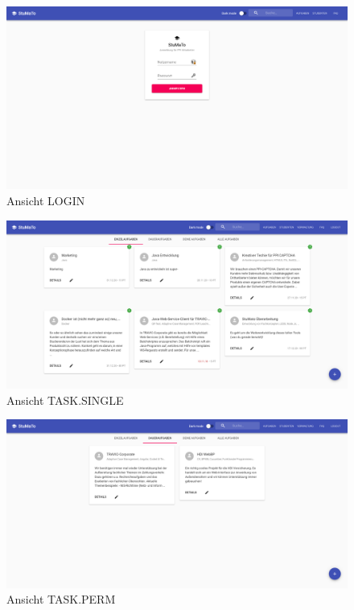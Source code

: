\documentclass[
  12pt,
  ngerman,
  a4paper,
]{article}
\begin{document}
\begin{figure}
\centering
\includegraphics{./tex2pdf.-930e6666e1221838/9c5b8c473ccddcd0dab08da12cb1120c18a9138c.png}
\caption{Ansicht LOGIN}
\end{figure}

\begin{figure}
\centering
\includegraphics{./tex2pdf.-930e6666e1221838/f4cc5b5ab578b1b679cdbb7e8f0658dd5512d9e2.png}
\caption{Ansicht TASK.SINGLE}
\end{figure}

\begin{figure}
\centering
\includegraphics{./tex2pdf.-930e6666e1221838/d3c6a43d479a4c11a45a24bd6d652630f2dfa188.png}
\caption{Ansicht TASK.PERM}
\end{figure}
\end{document}
